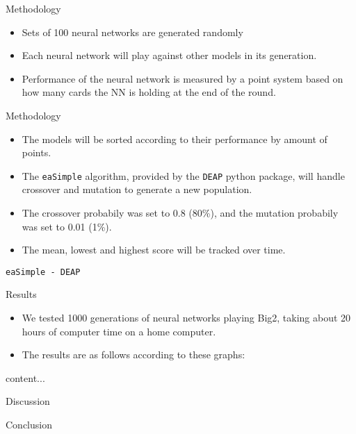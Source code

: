 \documentclass{beamer}
\begin{document}
\begin{frame}{Methodology}
	
	\begin{itemize}
	
		\item Sets of 100 neural networks are generated randomly
		\item Each neural network will play against other models in its generation.
		\item Performance of the neural network is measured by a point system based on how many cards the NN is holding at the end of the round.

	\end{itemize}
	
\end{frame}

\begin{frame}{Methodology}
	
	\begin{itemize}
		
		\item The models will be sorted according to their performance by amount of points.
		\item The \verb|eaSimple| algorithm, provided by the \texttt{DEAP} python package, will handle crossover and mutation to generate a new population.
		\item The crossover probabily was set to 0.8 (80\%), and the mutation probabily was set to 0.01 (1\%).
		\item The mean, lowest and highest score will be tracked over time.
		
	\end{itemize}
	
\end{frame}

\begin{frame}{\texttt{eaSimple - DEAP}}

\end{frame}

\begin{frame}{Results}
	
	\begin{itemize}
		\item We tested 1000 generations of neural networks playing Big2, taking about 20 hours of computer time on a home computer.
		\item The results are as follows according to these graphs:
	\end{itemize}
	
\end{frame}

\begin{frame}
	content...
\end{frame}

\begin{frame}{Discussion}
	
\end{frame}

\begin{frame}{Conclusion}

\end{frame}
\end{document}
